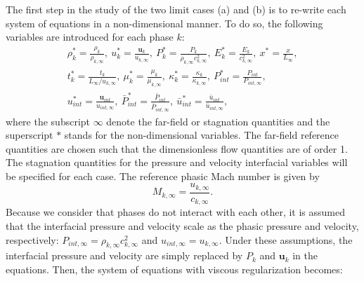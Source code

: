 \documentclass[preprint,10pt]{elsarticle}
\newcommand{\mbold}[1]{\boldsymbol#1}
\begin{document}
%
The first step in the study of the two limit cases (a) and (b) is to re-write each system of equations in a non-dimensional manner. To do so, the following variables are introduced for each phase $k$:
%
\begin{multline}
\label{eq:norm_param}
\rho_k^*   = \frac{\rho_k}{\rho_{k,\infty}}           ,\
u_k^*      = \frac{\mbold u_k}{u_{k,\infty}}                 ,\
P_k^*      = \frac{P_k}{\rho_{k,\infty} c^2_{k,\infty}}   ,\
E_k^*      = \frac{E_k}{c^2_{k,\infty} }              ,\
x^* = \frac{x}{L_\infty}                      ,\\
t_k^* = \frac{t_k}{L_\infty / u_{k,\infty}}           ,\
\mu_k^*    = \frac{\mu_k}{\mu_{k,\infty}}             ,\
\kappa_k^* = \frac{\kappa_k}{\kappa_{k,\infty}}       ,\
P_{int}^*    = \frac{P_{int}}{P_{int,\infty}}             ,\\
u_{int}^* = \frac{\mbold u_{int}}{u_{int,\infty}}       ,\
\bar{P}_{int}^*    = \frac{\bar{P}_{int}}{\bar{P}_{int,\infty}}             ,\
\bar{u}_{int}^* = \frac{\bar{u}_{int}}{\bar{u}_{int,\infty}}       ,\
\end{multline}
%
where  the subscript $\infty$ denote the far-field or stagnation quantities and the superscript $*$ stands for the non-dimensional variables. The far-field reference quantities are chosen such that the dimensionless flow quantities are of order 1. The stagnation quantities for the pressure and velocity interfacial variables will be specified for each case. The reference phasic Mach number is given by
%
\begin{equation}
M_{k,\infty} = \frac{u_{k,\infty}}{c_{k,\infty}}.
\end{equation}
%
Because we consider that phases do not interact with each other, it is assumed that the interfacial pressure and velocity scale as the phasic pressure and velocity, respectively: $P_{int,\infty} = \rho_{k,\infty} c^2_{k,\infty}$ and $u_{int,\infty} = u_{k,\infty}$. Under these assumptions, the interfacial pressure and velocity are simply replaced by $P_k$ and $\mbold u_k$ in the equations. Then, the system of equations with viscous regularization becomes:
% 
\end{document}
